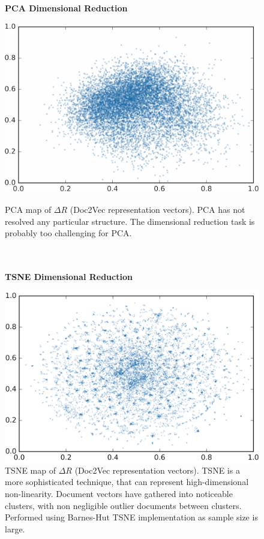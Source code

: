 \begin{figure}[H]
  \centering
  \begin{minipage}[b]{0.49\textwidth}
	\begin{center}\textbf{PCA Dimensional Reduction}\end{center}
    \includegraphics[width=\textwidth]{Validation/pca2.png}
    \caption[PCA Dimensional Reduction]{PCA map of $\Delta R$ (Doc2Vec representation vectors). PCA has not resolved any particular structure. The dimensional reduction task is probably too challenging for PCA.\\ \\ \\}
      \label{fig:PCA_snap}
  \end{minipage}
  \hfill
  \begin{minipage}[b]{0.49\textwidth}
  \begin{center}\textbf{TSNE Dimensional Reduction}\end{center}
    \includegraphics[width=\textwidth]{Validation/tsne2.png}
    \caption[TSNE Dimensional Reduction]{TSNE map of  $\Delta R$ (Doc2Vec representation vectors). TSNE is a more sophisticated technique, that can represent high-dimensional non-linearity. Document vectors have gathered into noticeable clusters, with non negligible outlier documents between clusters. Performed using Barnes-Hut TSNE implementation as sample size is large.}
      \label{fig:TSNE_snap}

  \end{minipage}
\end{figure}
\newpage
